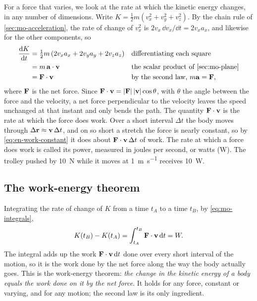 For a force that varies, we look at the rate at which the kinetic energy
changes, in any number of dimensions. Write $K = \frac12 m(v_x^2 + v_y^2
+ v_z^2)$. By the chain rule of \cref{sec:mo-acceleration}, the rate of
change of $v_x^2$ is $2v_x\,\dd v_x/\dd t = 2v_x a_x$, and likewise for
the other components, so
\begin{align*}
   \frac{\dd K}{\dd t}
   &= \tfrac12 m\,(2v_x a_x + 2v_y a_y + 2v_z a_z)
      && \text{differentiating each square}\\
   &= m\,\vb{a}\cdot\vb{v}
      && \text{the scalar product of \cref{sec:mo-plane}}\\
   &= \vb{F}\cdot\vb{v}
      && \text{by the second law, $m\vb{a} = \vb{F}$,}
\end{align*}
where $\bm{\mathrm{F}}$ is the net force. Since $\bm{\mathrm{F}}\cdot\bm{\mathrm{v}} = \lvert\bm{\mathrm{F}}
\rvert\,\lvert\bm{\mathrm{v}}\rvert\cos\theta$, with $\theta$ the angle between the
force and the velocity, a net force perpendicular to the velocity leaves
the speed unchanged at that instant and only bends the path. The quantity
$\bm{\mathrm{F}}\cdot\bm{\mathrm{v}}$ is the rate at which the force does work. Over a short interval $\Delta t$ the
body moves through $\Delta\bm{\mathrm{r}} \approx \bm{\mathrm{v}}\,\Delta t$, and on so short
a stretch the force is nearly constant, so by
\cref{eq:en-work-constant} it does about $\bm{\mathrm{F}}\cdot\bm{\mathrm{v}}\,\Delta t$ of
work. The rate at which a force does work is called its power, measured in
joules per second, or watts (\si{\watt}). The trolley pushed by
\SI{10}{\newton} while it moves at \SI{1}{\metre\per\second} receives
\SI{10}{\watt}.

\subsection*{The work-energy theorem}

Integrating the rate of change of $K$ from a time $t_A$ to a time $t_B$,
by \cref{eq:mo-integrals},
\begin{equation}
   K(t_B) - K(t_A) = \int_{t_A}^{t_B}\bm{\mathrm{F}}\cdot\bm{\mathrm{v}}\,\mathrm{d} t = W .
   \label{eq:en-work-energy}
\end{equation}
The integral adds up the work $\bm{\mathrm{F}}\cdot\bm{\mathrm{v}}\,\mathrm{d} t$ done over every
short interval of the motion, so it is the work done by the net force
along the way the body actually goes. This is the work-energy theorem:
\emph{the change in the kinetic energy of a body equals the work done on
it by the net force}. It holds for any force, constant or varying, and
for any motion; the second law is its only ingredient.

